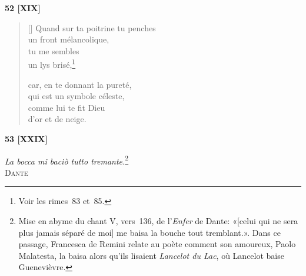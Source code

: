 \documentclass[a4paper,12pt]{book}
\begin{document}
\bigskip

\begin{center}
  \textbf{52 [XIX]}
\end{center}

\settowidth{\versewidth}{Quand sur ta poitrine tu penches}

\begin{verse}[\versewidth]
  Quand sur ta poitrine tu penches \\
  un front mélancolique, \\
  tu me sembles \\
  un lys brisé,\footnote{Voir les rimes~83 et~85.}

  car, en te donnant la pureté, \\
  qui est un symbole céleste, \\
  comme lui te fit Dieu \\
  d'or et de neige.
\end{verse}

\bigskip

\begin{center}
  \textbf{53 [XXIX]}
\end{center}

\settowidth{\versewidth}{Je sais seulement que nous nous tournâmes}

\begin{flushright}
  \emph{La bocca mi baciò tutto tremante.}\footnote{Mise en abyme du
  chant V, vers~136, de l'\emph{Enfer} de Dante: «[celui qui ne sera
  plus jamais  séparé de moi] me baisa la bouche tout
  tremblant.». Dans ce passage, Francesca de Remini relate au poète
  comment son amoureux, Paolo Malatesta, la baisa alors qu'ils
  lisaient \emph{Lancelot du Lac}, où Lancelot baise Guenevièvre.} \\
  \textsc{Dante}
\end{flushright}
\end{document}
